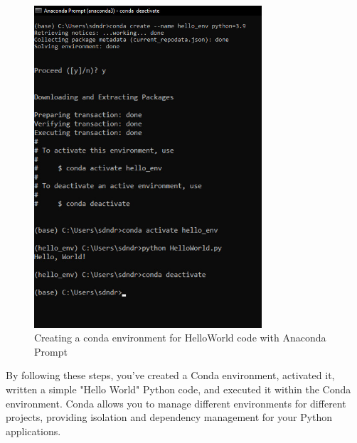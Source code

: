 \begin{center}
	\begin{figure}[h!]
		\begin{center}
			\includegraphics[height=120mm]{Images/CondaPrompt.jpg}
		\end{center}
		\caption{Creating a conda environment for HelloWorld code with Anaconda Prompt}
		\label{CondaPrompt}
	\end{figure}
\end{center}

By following these steps, you've created a Conda environment, activated it, written a simple "Hello World" Python code, and executed it within the Conda environment. Conda allows you to manage different environments for different projects, providing isolation and dependency management for your Python applications.





	
